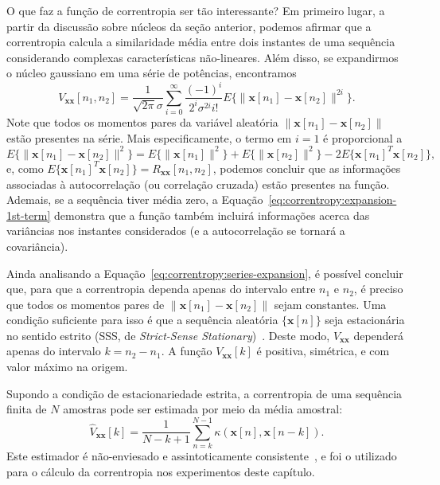 O que faz a função de correntropia ser tão interessante? Em primeiro lugar, a partir da
discussão sobre núcleos da seção anterior, podemos afirmar que a correntropia calcula a
similaridade média entre dois instantes de uma sequência considerando complexas
características não-lineares. Além disso, se expandirmos o núcleo gaussiano em uma
série de potências, encontramos
\begin{equation}
	V_{\textbf{x}\textbf{x}}[n_1, n_2] = \frac{1}{\sqrt{2\pi}\sigma} \sum_{i=0}^\infty \frac{(-1)^i}{2^i \sigma^{2i} i!} E\{ \lVert \mathbf{x}[n_1] - \mathbf{x}[n_2] \rVert^{2i} \}.
	\label{eq:correntropy:series-expansion}
\end{equation}
Note que todos os momentos pares da variável aleatória $\lVert\mathbf{x}[n_1] - \mathbf{x}[n_2]\rVert$ estão presentes na série. Mais especificamente, o termo em $i=1$ é proporcional a
\begin{equation}
	E\{ \lVert \mathbf{x}[n_1] - \mathbf{x}[n_2] \rVert^2 \} = E\{ \lVert \mathbf{x}[n_1] \rVert^2 \} + E\{ \lVert \mathbf{x}[n_2] \rVert ^2 \} - 2 E\{ \mathbf{x}[n_1]^T \mathbf{x}[n_2]\},
	\label{eq:correntropy:expansion-1st-term}
\end{equation}
e, como $E\{ \mathbf{x}[n_1]^T \mathbf{x}[n_2] \} = R_{\mathbf{x}\mathbf{x}}[n_1, n_2]$, podemos concluir que as informações associadas à autocorrelação (ou correlação cruzada) estão presentes na função. Ademais, se a sequência tiver média zero, a Equação~\eqref{eq:correntropy:expansion-1st-term} demonstra que a função também incluirá informações acerca das variâncias nos instantes considerados (e a autocorrelação se tornará a covariância).

Ainda analisando a Equação~\eqref{eq:correntropy:series-expansion}, é possível concluir
que, para que a correntropia dependa apenas do intervalo entre $n_1$ e $n_2$, é preciso
que todos os momentos pares de $\lVert\mathbf{x}[n_1] - \mathbf{x}[n_2]\rVert$ sejam
constantes. Uma condição suficiente para isso é que a sequência aleatória
$\{\mathbf{x}[n]\}$ seja estacionária no sentido estrito (SSS, de \textit{Strict-Sense
	Stationary})~\cite{peebles-1987}. Deste
modo, $V_{\textbf{x}\textbf{x}}$ dependerá apenas do intervalo $k = n_2 - n_1$. A
função $V_{\textbf{x}\textbf{x}}[k]$ é positiva, simétrica, e com valor máximo na
origem.

Supondo a condição de estacionariedade estrita, a correntropia de uma sequência finita
de $N$ amostras pode ser estimada por meio da média amostral:
\begin{equation}
	\hat{V}_{\textbf{x}\textbf{x}}[k] = \frac{1}{N - k + 1} \sum_{n=k}^{N-1} \kappa(\textbf{x}[n], \textbf{x}[n-k]).
\end{equation}
Este estimador é não-enviesado e assintoticamente consistente~\cite{santamaria-2006}, e foi o utilizado para o cálculo da correntropia nos experimentos deste capítulo.

